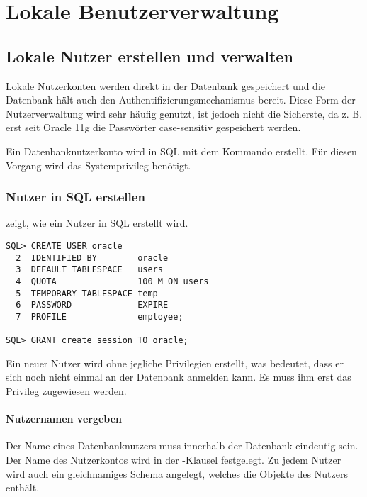 \chapter{Lokale Benutzerverwaltung}
    \setcounter{page}{1}
    \minitoc
\newpage
    \section{Lokale Nutzer erstellen und verwalten}
      Lokale Nutzerkonten werden direkt in der Datenbank gespeichert und die Datenbank h\"alt auch den Authentifizierungsmechanismus bereit. Diese Form der Nutzerverwaltung wird sehr h\"aufig genutzt, ist jedoch nicht die Sicherste, da z. B. erst seit Oracle 11g die Passw\"orter case-sensitiv gespeichert werden.

      Ein Datenbanknutzerkonto wird in SQL mit dem Kommando  erstellt. F\"ur diesen Vorgang wird das Systemprivileg  ben\"otigt.
      \subsection{Nutzer in SQL erstellen}
        \label{createuser}
         zeigt, wie ein Nutzer in SQL erstellt wird.
        \begin{lstlisting}[caption={Das CREATE USER
        Statement},label=admin200,language=oracle_sql]
SQL> CREATE USER oracle 
  2  IDENTIFIED BY        oracle
  3  DEFAULT TABLESPACE   users
  4  QUOTA                100 M ON users
  5  TEMPORARY TABLESPACE temp
  6  PASSWORD             EXPIRE
  7  PROFILE              employee;

SQL> GRANT create session TO oracle;
        \end{lstlisting}
        \begin{merke}
          Ein neuer Nutzer wird ohne jegliche Privilegien erstellt, was bedeutet, dass er sich noch nicht einmal an der Datenbank anmelden kann. Es muss ihm erst das  Privileg zugewiesen werden.
        \end{merke}
        \subsubsection{Nutzernamen vergeben}
          Der Name eines Datenbanknutzers muss innerhalb der Datenbank eindeutig sein. Der Name des Nutzerkontos wird in der -Klausel festgelegt. Zu jedem Nutzer wird auch ein gleichnamiges Schema angelegt, welches die Objekte des Nutzers enth\"alt.

